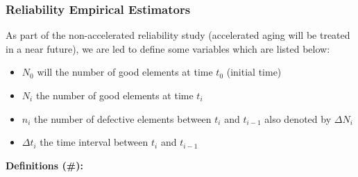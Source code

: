 	\subsubsection{Reliability Empirical Estimators}
	As part of the non-accelerated reliability study (accelerated aging will be treated in a near future), we are led to define some variables which are listed below:
	\begin{itemize}
		\item $N_0$ will the number of good elements at time $t_0$ (initial time)
		\item $N_i$ the number of good elements at time $t_i$
		\item $n_i$ the number of defective elements between $t_i$ and $t_{i-1}$ also denoted  by $\Delta N_i$
		\item $\Delta t_i$ the time interval between $t_i$ and $t_{i-1}$
	\end{itemize}
	\textbf{Definitions (\#\mydef):}
